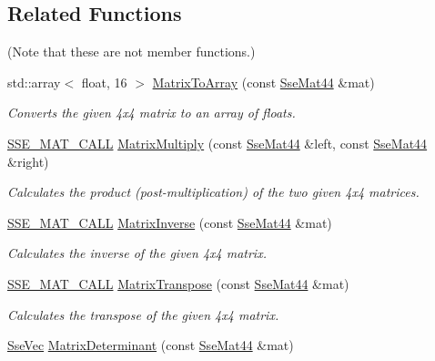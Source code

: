 \subsection*{Related Functions}
(Note that these are not member functions.) {\bf }\par
\begin{DoxyCompactItemize}
\item 
std\+::array$<$ float, 16 $>$ \hyperlink{classgofxmath_1_1_sse_mat44_a5f87ab4eb6093d145cda3e6772c6bc0a}{Matrix\+To\+Array} (const \hyperlink{classgofxmath_1_1_sse_mat44}{Sse\+Mat44} \&mat)
\begin{DoxyCompactList}\small\item\em Converts the given 4x4 matrix to an array of floats. \end{DoxyCompactList}\item 
\hyperlink{ssemat__math__defs_8h_a741f88d5589197d03fea9ab2b7622b8a}{S\+S\+E\+\_\+\+M\+A\+T\+\_\+\+C\+A\+L\+L} \hyperlink{classgofxmath_1_1_sse_mat44_ab38872b965a424d2660e1c4be71ddbe6}{Matrix\+Multiply} (const \hyperlink{classgofxmath_1_1_sse_mat44}{Sse\+Mat44} \&left, const \hyperlink{classgofxmath_1_1_sse_mat44}{Sse\+Mat44} \&right)
\begin{DoxyCompactList}\small\item\em Calculates the product (post-\/multiplication) of the two given 4x4 matrices. \end{DoxyCompactList}\item 
\hyperlink{ssemat__math__defs_8h_a741f88d5589197d03fea9ab2b7622b8a}{S\+S\+E\+\_\+\+M\+A\+T\+\_\+\+C\+A\+L\+L} \hyperlink{classgofxmath_1_1_sse_mat44_a7d63a634b20c220ad6047dc4633bf70f}{Matrix\+Inverse} (const \hyperlink{classgofxmath_1_1_sse_mat44}{Sse\+Mat44} \&mat)
\begin{DoxyCompactList}\small\item\em Calculates the inverse of the given 4x4 matrix. \end{DoxyCompactList}\item 
\hyperlink{ssemat__math__defs_8h_a741f88d5589197d03fea9ab2b7622b8a}{S\+S\+E\+\_\+\+M\+A\+T\+\_\+\+C\+A\+L\+L} \hyperlink{classgofxmath_1_1_sse_mat44_a8c2545c52a86496bdf8917a1158f6f24}{Matrix\+Transpose} (const \hyperlink{classgofxmath_1_1_sse_mat44}{Sse\+Mat44} \&mat)
\begin{DoxyCompactList}\small\item\em Calculates the transpose of the given 4x4 matrix. \end{DoxyCompactList}\item 
\hyperlink{namespacegofxmath_a634570ddcd2496053ee966227080e02f}{Sse\+Vec} \hyperlink{classgofxmath_1_1_sse_mat44_a6709364ddedc83299a1d6a58607a87aa}{Matrix\+Determinant} (const \hyperlink{classgofxmath_1_1_sse_mat44}{Sse\+Mat44} \&mat)

\end{DoxyCompactItemize}
